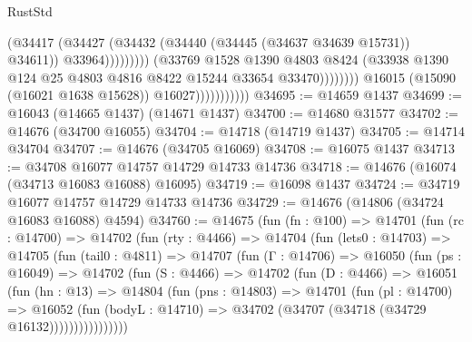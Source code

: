 \begin{lexlean}{RustStd}
\begin{coremodule}
                                                    (@34417
                                                      (@34427
                                                        (@34432
                                                          (@34440
                                                            (@34445 (@34637 @34639 @15731))
                                                            @34611))
                                                        @33964)))))))))
                                      (@33769
                                        @1528
                                        @1390
                                        @4803
                                        @8424
                                        (@33938
                                          @1390
                                          @124
                                          @25
                                          @4803
                                          @4816
                                          @8422
                                          @15244
                                          @33654
                                          @33470))))))))
                          @16015
                          (@15090 (@16021 @1638 @15628))
                          @16027)))))))))))
@34695 := @14659 @1437
@34699 := @16043 (@14665 @1437) (@14671 @1437)
@34700 := @14680 @31577
@34702 := @14676 (@34700 @16055)
@34704 := @14718 (@14719 @1437)
@34705 := @14714 @34704
@34707 := @14676 (@34705 @16069)
@34708 := @16075 @1437
@34713 := @34708 @16077 @14757 @14729 @14733 @14736
@34718 := @14676 (@16074 (@34713 @16083 @16088) @16095)
@34719 := @16098 @1437
@34724 := @34719 @16077 @14757 @14729 @14733 @14736
@34729 := @14676 (@14806 (@34724 @16083 @16088) @4594)
@34760 := @14675
    (fun (fn : @100) =>
    @14701
      (fun (rc : @14700) =>
      @14702
        (fun (rty : @4466) =>
        @14704
          (fun (lets0 : @14703) =>
          @14705
            (fun (tail0 : @4811) =>
            @14707
              (fun (Γ : @14706) =>
              @16050
                (fun (ps : @16049) =>
                @14702
                  (fun (S : @4466) =>
                  @14702
                    (fun (D : @4466) =>
                    @16051
                      (fun (hn : @13) =>
                      @14804
                        (fun (pns : @14803) =>
                        @14701
                          (fun (pl : @14700) =>
                          @16052
                            (fun (bodyL : @14710) =>
                            @34702 (@34707 (@34718 (@34729 @16132))))))))))))))))

\end{coremodule}
\end{lexlean}
